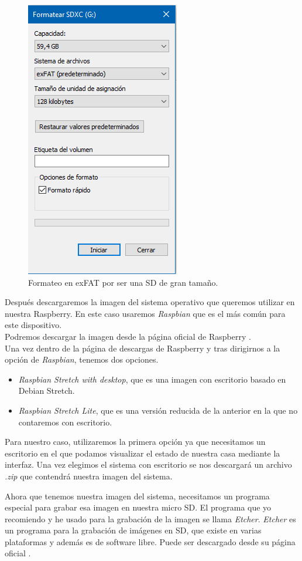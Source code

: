 \begin{figure}[h!]
	\centering
	\includegraphics[width=0.4\linewidth]{img/formateo}
	\caption{Formateo en exFAT por ser una SD de gran tamaño.}
	\label{fig:formateo}
\end{figure}
Después descargaremos la imagen del sistema operativo que queremos utilizar en nuestra Raspberry. En este caso usaremos \textit{Raspbian} que es el más común para este dispositivo.\\
Podremos descargar la imagen desde la página oficial de Raspberry \cite{raspberry:raspbian}.\\
Una vez dentro de la página de descargas de Raspberry y tras dirigirnos a la opción de \textit{Raspbian}, tenemos dos opciones.

\begin{itemize}
	\item \textit{Raspbian Stretch with desktop}, que es una imagen con escritorio basado en Debian Stretch.
	\item \textit{Raspbian Stretch Lite}, que es una versión reducida de la anterior en la que no contaremos con escritorio.
\end{itemize}

Para nuestro caso, utilizaremos la primera opción ya que necesitamos un escritorio en el que podamos visualizar el estado de nuestra casa mediante la interfaz. Una vez elegimos el sistema con escritorio se nos descargará un archivo \textit{.zip} que contendrá nuestra imagen del sistema.

Ahora que tenemos nuestra imagen del sistema, necesitamos un programa especial para grabar esa imagen en nuestra micro SD. El programa que yo recomiendo y he usado para la grabación de la imagen se llama \textit{Etcher}. \textit{Etcher} es un programa para la grabación de imágenes en SD, que existe en varias plataformas y además es de software libre. Puede ser descargado desde su página oficial \cite{etcher:url}.

